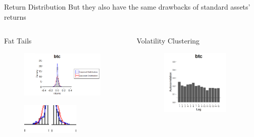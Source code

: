 \documentclass[c, 10pt]{beamer}
\begin{document}
\begin{frame}{Return Distribution}
But they also have the same drawbacks of standard assets' returns
	\begin{columns}
		\begin{column}{0.5\textwidth}
		\centering
		\bigskip
		
		Fat Tails
		\begin{figure}
			\includegraphics[width=4cm]{Images/distrbtc.png}
		\end{figure}
		\begin{figure}
			\includegraphics[width=1.3cm]{Images/codasinistra}
			\includegraphics[width=1.3cm]{Images/codadestra}
		\end{figure}
		\end{column}
		\begin{column}{0.5\textwidth}  
		\centering
		Volatility Clustering
		\begin{figure}
			\includegraphics[width=4cm, height=3.1cm]{Images/clust}
		\end{figure}
		\end{column}
	\end{columns}
\end{frame}
\end{document}
